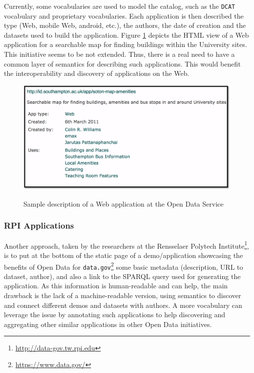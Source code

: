 Currently, some vocabularies are used to model the catalog, such as the \texttt{DCAT} vocabulary \cite{dcat} and proprietary vocabularies. Each application is then described the type (Web, mobile Web, android, etc.), the authors, the date of creation and the datasets used to build the application. Figure \ref{fig:app-amenity} depicts the HTML view of a Web application
for a searchable map for finding buildings within the University sites. This initiative seems to be not extended. Thus, there is a real need to have a common layer of semantics for describing such applications. This would benefit the interoperability and discovery of applications on the Web.
\begin{figure}
\includegraphics[scale=.7]{img/soton-map-amenities.pdf}
\label{fig:app-amenity}
\vspace{-10pt}
\caption{Sample description of a Web application  at the Open Data Service}
\end{figure}

\subsubsection{RPI Applications}
Another approach, taken by the researchers at the Rensselaer Polytech Institute\footnote{\url{http://data-gov.tw.rpi.edu}}, is to put at the bottom of the static page of a demo/application showcasing the benefits of Open Data for \texttt{data.gov}\footnote{\url{https://www.data.gov/}} some basic metadata (description, URL to dataset, author), and also a link to the SPARQL query used for generating the application. As this information is human-readable and can help, the main drawback is the lack of a machine-readable version, using semantics to discover and connect different demos and datasets with authors. A more vocabulary can leverage the issue by annotating such applications to help discovering and aggregating other similar applications in other Open Data initiatives.

